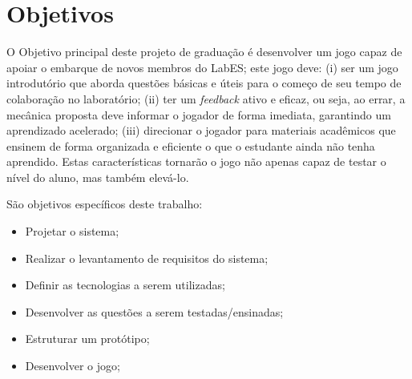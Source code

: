 \section{Objetivos}
\label{sec-intro-obj}


O Objetivo principal deste projeto de graduação é desenvolver um jogo capaz de apoiar o embarque de novos membros do LabES; este jogo deve: (i) ser um jogo introdutório que aborda questões básicas e úteis para o começo de seu tempo de colaboração no laboratório; (ii) ter um \textit{feedback} ativo e eficaz, ou seja, ao errar, a mecânica proposta deve informar o jogador de forma imediata, garantindo um aprendizado acelerado; (iii) direcionar o jogador para materiais acadêmicos que ensinem de forma organizada e eficiente o que o estudante ainda não tenha aprendido. Estas características tornarão o jogo não apenas capaz de testar o nível do aluno, mas também elevá-lo.

    São objetivos específicos deste trabalho:
\begin{itemize}
    \item Projetar o sistema;
    \item Realizar o levantamento de requisitos do sistema;
    \item Definir as tecnologias a serem utilizadas;
    \item Desenvolver as questões a serem testadas/ensinadas;
    \item Estruturar um protótipo;
    \item Desenvolver o jogo;
\end{itemize}




